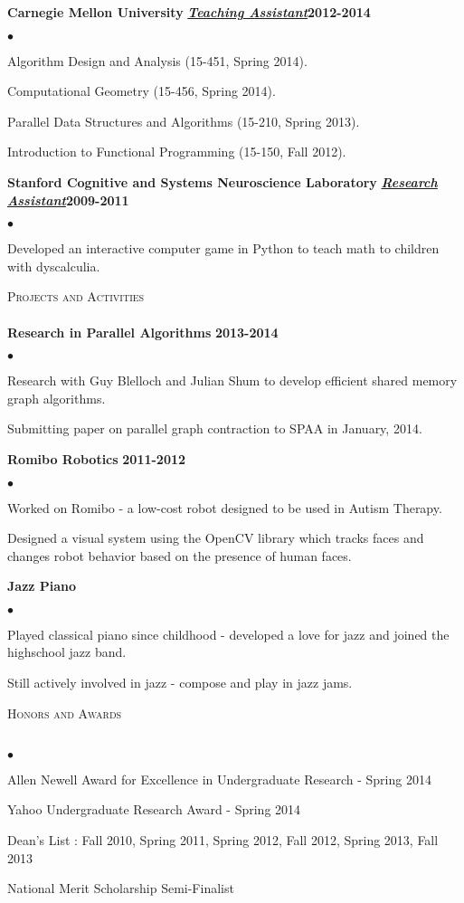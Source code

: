 \documentclass{article}
\newcommand{\lineunder}{\vspace*{-8pt} \\ \hspace*{-18pt} \hrulefill \\}
\newcommand{\header}[1]{{\hspace*{-15pt}\vspace*{6pt} \textsc{\large #1}} \vspace*{-6pt} \lineunder}
\newcommand{\employer}[3]{{ \textbf{#1} \underline{\textbf{\emph{#3}}}\hfill\textbf{#2}\\  }}
\newenvironment{achievements}{\begin{list}{$\bullet$}{\topsep 0pt \itemsep -2pt}}{\vspace*{4pt}\end{list}}
\begin{document}
\employer{Carnegie Mellon University}{2012-2014}{Teaching Assistant}
  \begin{achievements}
    \item Algorithm Design and Analysis (15-451, Spring 2014). 
    \item Computational Geometry (15-456, Spring 2014). 
    \item Parallel Data Structures and Algorithms (15-210, Spring 2013).
    \item Introduction to Functional Programming (15-150, Fall 2012). 
  \end{achievements}

\employer{Stanford Cognitive and Systems Neuroscience Laboratory}{2009-2011}{Research Assistant}
  \begin{achievements}
    \item Developed an interactive computer game in Python to teach math to children with dyscalculia.
  \end{achievements}
\medskip

\header{Projects and Activities}
\employer{Research in Parallel Algorithms}{2013-2014}{}
	\begin{achievements}
    \item Research with Guy Blelloch and Julian Shum to develop efficient shared memory graph algorithms. 
    \item Submitting paper on parallel graph contraction to SPAA in January, 2014. 
  \end{achievements}

\employer{Romibo Robotics}{2011-2012}{}
	\begin{achievements}
	    \item Worked on Romibo - a low-cost robot designed to be used in Autism Therapy.
      \item Designed a visual system using the OpenCV library which tracks faces and changes robot behavior based on the presence of human faces. 
	\end{achievements}

\employer{Jazz Piano}{}{}
	\begin{achievements}
        \item Played classical piano since childhood - developed a love for jazz and joined the highschool jazz band. 
        \item Still actively involved in jazz - compose and play in jazz jams. 
	\end{achievements}

\header{Honors and Awards}
\begin{achievements}
\item Allen Newell Award for Excellence in Undergraduate Research - Spring 2014
\item Yahoo Undergraduate Research Award - Spring 2014
\item Dean's List : Fall 2010, Spring 2011, Spring 2012, Fall 2012, Spring 2013, Fall 2013
\item National Merit Scholarship Semi-Finalist
\end{achievements}
\end{document}
